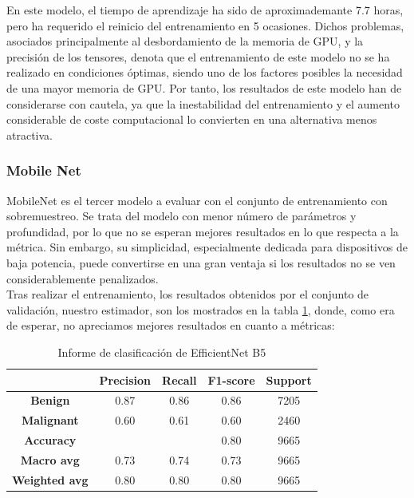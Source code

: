  En este modelo, el tiempo de aprendizaje ha sido de aproximademante 7.7 horas, pero ha requerido el reinicio del entrenamiento en 5 ocasiones. Dichos problemas, asociados principalmente al desbordamiento de la memoria de GPU, y la precisión de los tensores, denota que el entrenamiento de este modelo no se ha realizado en condiciones óptimas, siendo uno de los factores posibles la necesidad de una mayor memoria de GPU. Por tanto, los resultados de este modelo han de considerarse con cautela, ya que la inestabilidad del entrenamiento y el aumento considerable de coste computacional lo convierten en una alternativa menos atractiva.

\subsubsection{Mobile Net}

MobileNet es el tercer modelo a evaluar con el conjunto de entrenamiento con sobremuestreo. Se trata del modelo con menor número de parámetros y profundidad, por lo que no se esperan mejores resultados en lo que respecta  a la métrica. Sin embargo, su simplicidad, especialmente dedicada para dispositivos de baja potencia, puede convertirse en una gran ventaja si los resultados no se ven considerablemente penalizados.\\

Tras realizar el entrenamiento, los resultados obtenidos por el conjunto de validación, nuestro estimador, son los mostrados en la tabla \ref{tab:mob}, donde, como era de esperar, no apreciamos mejores resultados en cuanto a métricas:   

\begin{table}[H]
	\centering
	\begin{tabular}{|c|c|c|c|c|}
		\hline
		\textbf{} & \textbf{Precision} & \textbf{Recall} & \textbf{F1-score} & \textbf{Support} \\ \hline
		\textbf{Benign} & 0.87 & 0.86 & 0.86 & 7205 \\ \hline
		\textbf{Malignant} & 0.60 & 0.61 & 0.60 & 2460 \\ \hline
		\textbf{Accuracy} &  &  & 0.80 & 9665 \\ \hline
		\textbf{Macro avg} & 0.73 & 0.74 & 0.73 & 9665 \\ \hline
		\textbf{Weighted avg} & 0.80& 0.80 & 0.80 & 9665 \\ \hline
	\end{tabular}
	\caption{Informe de clasificación de EfficientNet B5}
	\label{tab:mob}
\end{table}


